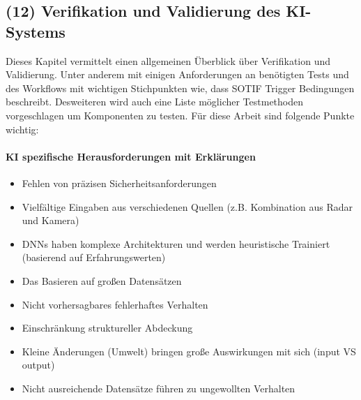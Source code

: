\subsection{(12) Verifikation und Validierung des KI-Systems}
Dieses Kapitel vermittelt einen allgemeinen Überblick über Verifikation und Validierung. Unter anderem mit einigen Anforderungen 
an benötigten Tests und des Workflows mit wichtigen Stichpunkten wie, dass SOTIF Trigger Bedingungen beschreibt. 
Desweiteren wird auch eine Liste möglicher Testmethoden vorgeschlagen um Komponenten zu testen. Für diese 
Arbeit sind folgende Punkte wichtig:

\paragraph{KI spezifische Herausforderungen mit Erklärungen}
\begin{itemize}
  \item Fehlen von präzisen Sicherheitsanforderungen
  \item Vielfältige Eingaben aus verschiedenen Quellen (z.B. Kombination aus Radar und Kamera)
  \item DNNs haben komplexe Architekturen und werden heuristische Trainiert (basierend auf Erfahrungswerten)
  \item Das Basieren auf großen Datensätzen
  \item Nicht vorhersagbares fehlerhaftes Verhalten
  \item Einschränkung struktureller Abdeckung
  \item Kleine Änderungen (Umwelt) bringen große Auswirkungen mit sich (input VS output)
  \item Nicht ausreichende Datensätze führen zu ungewollten Verhalten
\end{itemize}



